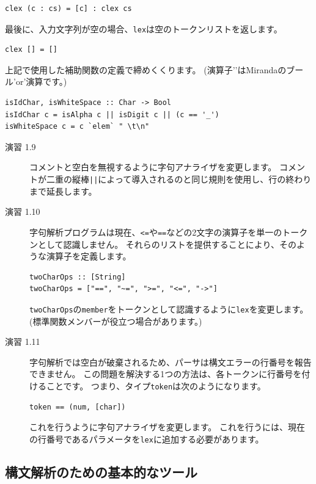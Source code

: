 \documentclass{jbook}
\begin{document}
\begin{verbatim}
clex (c : cs) = [c] : clex cs
\end{verbatim}

最後に、入力文字列が空の場合、\texttt{lex}は空のトークンリストを返します。

\begin{verbatim}
clex [] = []
\end{verbatim}

上記で使用した補助関数の定義で締めくくります。
(演算子'\texttt{\/}'はMirandaのブール'or'演算です。)

\begin{verbatim}
isIdChar, isWhiteSpace :: Char -> Bool
isIdChar c = isAlpha c || isDigit c || (c == '_')
isWhiteSpace c = c `elem` " \t\n"
\end{verbatim}

\begin{description}
	\item[演習 1.9] コメントと空白を無視するように字句アナライザを変更します。
		コメントが二重の縦棒\texttt{||}によって導入されるのと同じ規則を使用し、行の終わりまで延長します。
	\item[演習 1.10] 字句解析プログラムは現在、\texttt{<=}や\texttt{==}などの2文字の演算子を単一のトークンとして認識しません。
		それらのリストを提供することにより、そのような演算子を定義します。

		\begin{verbatim}
twoCharOps :: [String]
twoCharOps = ["==", "~=", ">=", "<=", "->"]
\end{verbatim}

		\texttt{twoCharOps}の\texttt{member}をトークンとして認識するように\texttt{lex}を変更します。
		(標準関数メンバーが役立つ場合があります。)
	\item[演習 1.11] 字句解析では空白が破棄されるため、パーサは構文エラーの行番号を報告できません。
		この問題を解決する1つの方法は、各トークンに行番号を付けることです。
		つまり、タイプ\texttt{token}は次のようになります。

		\begin{verbatim}
token == (num, [char])
\end{verbatim}

		これを行うように字句アナライザを変更します。
		これを行うには、現在の行番号であるパラメータを\texttt{lex}に追加する必要があります。
\end{description}

\subsection{構文解析のための基本的なツール}
\end{document}
